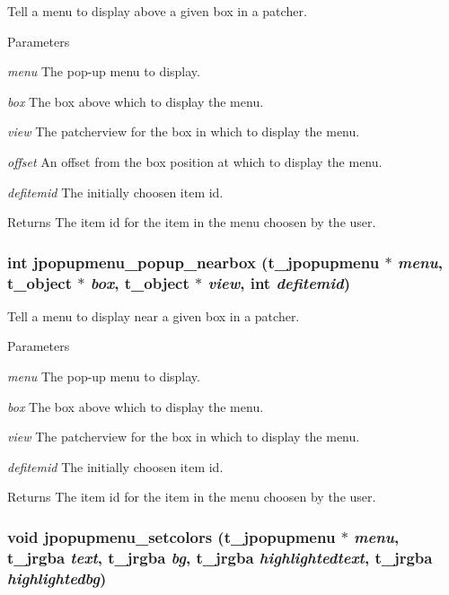 Tell a menu to display above a given box in a patcher. 
\begin{DoxyParams}{Parameters}
\item[{\em menu}]The pop-\/up menu to display. \item[{\em box}]The box above which to display the menu. \item[{\em view}]The patcherview for the box in which to display the menu. \item[{\em offset}]An offset from the box position at which to display the menu. \item[{\em defitemid}]The initially choosen item id. \end{DoxyParams}
\begin{DoxyReturn}{Returns}
The item id for the item in the menu choosen by the user. 
\end{DoxyReturn}
\hypertarget{group__jpopupmenu_gab7ff50b3fcc40c38c478f97b1848e099}{
\subsubsection[{jpopupmenu\_\-popup\_\-nearbox}]{\setlength{\rightskip}{0pt plus 5cm}int jpopupmenu\_\-popup\_\-nearbox ({\bf t\_\-jpopupmenu} $\ast$ {\em menu}, \/  {\bf t\_\-object} $\ast$ {\em box}, \/  {\bf t\_\-object} $\ast$ {\em view}, \/  int {\em defitemid})}}
\label{group__jpopupmenu_gab7ff50b3fcc40c38c478f97b1848e099}


Tell a menu to display near a given box in a patcher. 
\begin{DoxyParams}{Parameters}
\item[{\em menu}]The pop-\/up menu to display. \item[{\em box}]The box above which to display the menu. \item[{\em view}]The patcherview for the box in which to display the menu. \item[{\em defitemid}]The initially choosen item id. \end{DoxyParams}
\begin{DoxyReturn}{Returns}
The item id for the item in the menu choosen by the user. 
\end{DoxyReturn}
\hypertarget{group__jpopupmenu_gaef73894f17b579c0cc6cc6d56de4ffe5}{
\subsubsection[{jpopupmenu\_\-setcolors}]{\setlength{\rightskip}{0pt plus 5cm}void jpopupmenu\_\-setcolors ({\bf t\_\-jpopupmenu} $\ast$ {\em menu}, \/  {\bf t\_\-jrgba} {\em text}, \/  {\bf t\_\-jrgba} {\em bg}, \/  {\bf t\_\-jrgba} {\em highlightedtext}, \/  {\bf t\_\-jrgba} {\em highlightedbg})}}
\label{group__jpopupmenu_gaef73894f17b579c0cc6cc6d56de4ffe5}


